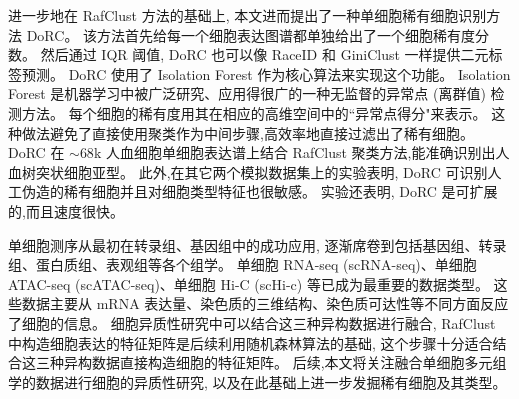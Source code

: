 
进一步地在 RafClust 方法的基础上, 本文进而提出了一种单细胞稀有细胞识别方法 DoRC。
该方法首先给每一个细胞表达图谱都单独给出了一个细胞稀有度分数。
然后通过 IQR 阈值, DoRC 也可以像 RaceID 和 GiniClust 一样提供二元标签预测。
DoRC 使用了 Isolation Forest 作为核心算法来实现这个功能。
Isolation Forest 是机器学习中被广泛研究、应用得很广的一种无监督的异常点 (离群值) 检测方法。
每个细胞的稀有度用其在相应的高维空间中的``异常点得分"来表示。
这种做法避免了直接使用聚类作为中间步骤,高效率地直接过滤出了稀有细胞。
DoRC 在 ${\sim}68$k 人血细胞单细胞表达谱上结合 RafClust 聚类方法,能准确识别出人血树突状细胞亚型。
此外,在其它两个模拟数据集上的实验表明, DoRC 可识别人工伪造的稀有细胞并且对细胞类型特征也很敏感。
实验还表明, DoRC 是可扩展的,而且速度很快。

单细胞测序从最初在转录组、基因组中的成功应用, 逐渐席卷到包括基因组、转录组、蛋白质组、表观组等各个组学。
单细胞 RNA-seq (scRNA-seq)、单细胞 ATAC-seq (scATAC-seq)、单细胞 Hi-C (scHi-c) 等已成为最重要的数据类型。
这些数据主要从 mRNA 表达量、染色质的三维结构、染色质可达性等不同方面反应了细胞的信息。
细胞异质性研究中可以结合这三种异构数据进行融合, RafClust 中构造细胞表达的特征矩阵是后续利用随机森林算法的基础,
这个步骤十分适合结合这三种异构数据直接构造细胞的特征矩阵。
后续,本文将关注融合单细胞多元组学的数据进行细胞的异质性研究, 以及在此基础上进一步发掘稀有细胞及其类型。

